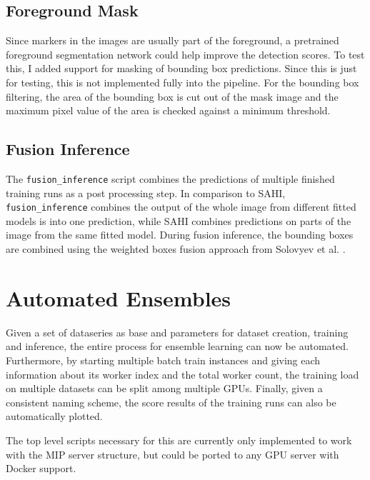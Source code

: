 \documentclass[10pt]{book}
\begin{document}
\subsection{Foreground Mask}

Since markers in the images are usually part of the foreground, a pretrained foreground segmentation network could help improve the detection scores.
To test this, I added support for masking of bounding box predictions. Since this is just for testing, this is not implemented fully into the pipeline. For the bounding box filtering, the area of the bounding box is cut out of the mask image and the maximum pixel value of the area is checked against a minimum threshold. %

\subsection{Fusion Inference}

The \texttt{fusion\_inference} script combines the predictions of multiple finished training runs as a post processing step. In comparison to \ac{SAHI}, \texttt{fusion\_inference} combines the output of the whole image from different fitted models is into one prediction, while \ac{SAHI} combines predictions on parts of the image from the same fitted model. During fusion inference, the bounding boxes are combined using the weighted boxes fusion approach from Solovyev et al. \cite{solovyev2021weighted}.


\section{Automated Ensembles}

Given a set of dataseries as base and parameters for dataset creation, training and inference, the entire process for ensemble learning can now be automated. Furthermore, by starting multiple batch train instances and giving each information about its worker index and the total worker count, the training load on multiple datasets can be split among multiple \acp{GPU}. Finally, given a consistent naming scheme, the score results of the training runs can also be automatically plotted.

The top level scripts necessary for this are currently only implemented to work with the \ac{MIP} server structure, but could be ported to any \ac{GPU} server with Docker support.
\end{document}
